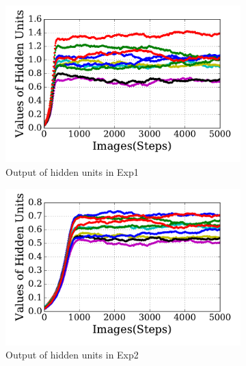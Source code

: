 \begin{figure}
\begin{subfigure}[t]{0.48\textwidth}
		\DIFaddendFL \includegraphics[width=\textwidth]{pics_sdlm/30_exp_RBM/exp1_hid_non.pdf}
		\caption{Output of hidden units in Exp1}
	\end{subfigure}
	\DIFdelbeginFL %
\DIFdelendFL \DIFaddbeginFL \begin{subfigure}[t]{0.48\textwidth}
		\DIFaddendFL \includegraphics[width=\textwidth]{pics_sdlm/30_exp_RBM/exp2_hid_non.pdf}
		\caption{Output of hidden units in Exp2}
	\end{subfigure}\\
	\DIFdelbeginFL %
\DIFdelendFL \DIFaddbeginFL \begin{subfigure}[t]{0.48\textwidth}

\end{subfigure}
\end{figure}
